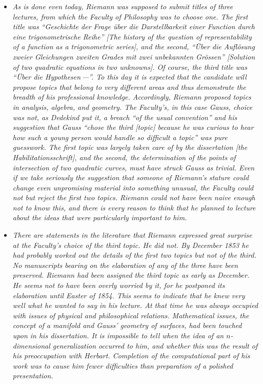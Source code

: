 \documentclass[12pt]{article}
\begin{document}
\begin{itemize}

\item[]{\it As is done even today, Riemann was supposed to submit titles of three lectures, from which the Faculty of Philosophy was to choose one. The first title was ``Geschichte der Frage \"uber die Darstellbarkeit einer Function durch eine trigonometrische Reihe'' [The history of the question of representability of a function as a trigonometric series], and the second, ``\"Uber die Aufl\"osung zweier Gleichungen zweiten Grades mit zwei unbekannten Gr\"ossen'' [Solution of two quadratic equations in two unknowns]. Of course, the third title was ``\"Uber die Hypothesen $\cdots$''. To this day it is expected that the candidate will propose topics that belong to very different areas and thus demonstrate the breadth of his professional knowledge. Accordingly, Riemann proposed topics in analysis, algebra, and geometry. The Faculty's, in this case Gauss, choice was not, as Dedekind put it, a breach ``of the usual convention'' and his suggestion that Gauss ``chose the third [topic] because he was curious to hear how such a young person would handle so difficult a topic'' was pure guesswork. The first topic was largely taken care of by the dissertation [the  Habilitationsschrift], and the second, the determination of the points of intersection of two quadratic curves, must have struck Gauss as trivial. Even if we take seriously the suggestion that someone of Riemann's stature could change even unpromising material into something unusual, the Faculty could not but reject the first two topics. Riemann could not have been naive enough not to know this, and there is every reason to think that he planned to lecture about the ideas that were particularly important to him.}

\item[]{\it There are statements in the literature that Riemann expressed great surprise at the Faculty's choice of the third topic. He did not. By December 1853 he had probably worked out the details of the first two topics but not of the third. No manuscripts bearing on the elaboration of any of the three have been preserved. Riemann had been assigned the third topic as early as December. He seems not to have been overly worried by it, for he postponed its elaboration until Easter of 1854. This seems to indicate that he knew very well what he wanted to say in his lecture. At that time he was always occupied with issues of physical and philosophical relations. Mathematical issues, the concept of a manifold and Gauss' geometry of surfaces, had been touched upon in his dissertation. It is impossible to tell when the idea of an $n$-dimensional generalization occurred to him, and whether this was the result of his preoccupation with Herbart. Completion of the computational part of his work was to cause him fewer difficulties than preparation of a polished presentation.}

\end{itemize}
\end{document}
